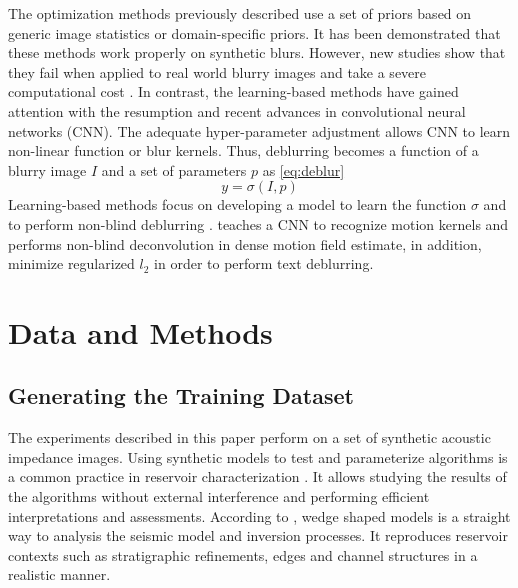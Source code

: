 \documentclass[conference]{IEEEtran}
\begin{document}
The optimization methods previously described use a set of priors based on
generic image statistics or domain-specific priors. It has been demonstrated
that these methods work properly on synthetic blurs. However, new studies show that they fail
when applied to real world blurry images \cite{Lai2016} and take a severe computational cost \cite{Chakrabarti2016}.
In contrast, the learning-based methods have gained attention with the resumption and recent advances in convolutional neural
networks (CNN). The adequate hyper-parameter adjustment allows CNN to learn
non-linear function or blur kernels. Thus, deblurring becomes a function of a blurry image $I$
and a set of parameters $p$ as \eqref{eq:deblur}
\begin{equation}
 y = \sigma(I,p)
 \label{eq:deblur}
\end{equation}
Learning-based methods focus on developing a model to learn the function $\sigma$ \cite{Hradis2015}
and to perform non-blind deblurring \cite{Chakrabarti2016}. \cite{Sun2015} teaches a CNN to
recognize motion kernels and performs non-blind deconvolution in
dense motion field estimate, in addition, \cite{Hradis2015} minimize regularized $l_2$ 
in order to perform text deblurring.

\section{Data and Methods} \label{DMsection}
\subsection{Generating the Training Dataset}
The experiments described in this paper perform
on a set of synthetic acoustic impedance images. Using synthetic models
to test and parameterize algorithms is a common practice in reservoir characterization \cite{Sergio2016}. It allows studying the
results of the algorithms without external interference and performing efficient interpretations and assessments. 
According to \cite{Harvey}, wedge shaped models is a straight way to analysis the
seismic model and inversion processes. It reproduces
reservoir contexts such as stratigraphic refinements, edges and channel structures in a realistic manner.
\end{document}
